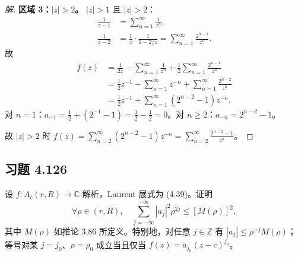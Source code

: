 \documentclass[11pt,a4paper]{article}
\newcommand{\C}{\mathbb{C}}
\newcommand{\Z}{\mathbb{Z}}
\theoremstyle{definition}
\newenvironment{solution}{\begin{proof}[解]}{\end{proof}}
\begin{document}
\begin{solution}
  \medskip
  \noindent\textbf{区域 3：$|z| > 2$。}
  $|z| > 1$ 且 $|z| > 2$：
  \begin{align*}
    \frac{1}{z-1} &= \sum_{n=1}^{\infty} \frac{1}{z^n},\\
    \frac{1}{z-2} &= \frac{1}{z} \cdot \frac{1}{1 - 2/z}
    = \sum_{n=1}^{\infty} \frac{2^{n-1}}{z^n}.
  \end{align*}
  故
  \begin{align*}
    f(z) &= \frac{1}{2z} - \sum_{n=1}^{\infty} \frac{1}{z^n}
    + \frac{1}{2} \sum_{n=1}^{\infty} \frac{2^{n-1}}{z^n}\\
    &= \frac{1}{2}z^{-1} - \sum_{n=1}^{\infty} z^{-n}
    + \sum_{n=1}^{\infty} \frac{2^{n-2}}{z^n}\\
    &= \frac{1}{2}z^{-1} + \sum_{n=1}^{\infty} (2^{n-2} - 1) z^{-n}.
  \end{align*}
  对 $n = 1$：$a_{-1} = \frac{1}{2} + (2^{-1} - 1) = \frac{1}{2} - \frac{1}{2} = 0$。对 $n \ge 2$：$a_{-n} = 2^{n-2} - 1$。

  故 $|z| > 2$ 时 $f(z) = \sum_{n=2}^{\infty} (2^{n-2} - 1) z^{-n} = \sum_{n=2}^{\infty} \frac{2^{n-2} - 1}{z^n}$。
\end{solution}

\subsection{习题 4.126}

设 $f : A_c(r, R) \to \C$ 解析，Laurent 展式为 (4.39)。证明
\[
  \forall \rho \in (r, R), \quad
  \sum_{j=-\infty}^{+\infty} |a_j|^2 \rho^{2j} \le [M(\rho)]^2,
\]
其中 $M(\rho)$ 如推论 3.86 所定义。特别地，对任意 $j \in \Z$ 有 $|a_j| \le \rho^{-j} M(\rho)$；等号对某 $j = j_0$、$\rho = \rho_0$ 成立当且仅当 $f(z) = a_{j_0}(z-c)^{j_0}$。
\end{document}
